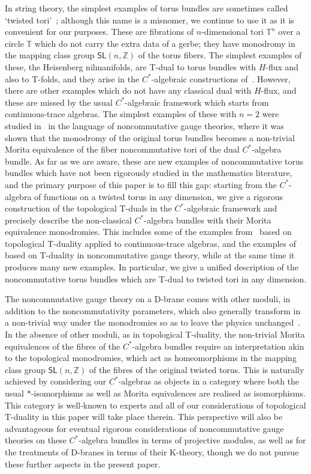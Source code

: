 \documentclass[pdftex]{sigma}
\numberwithin{equation}{section}
\newcommand{\Z}{\zed}
\newcommand{\sfSL}{\mathsf{SL}}
\newcommand{\zed}{{\mathbb Z}} %
\newcommand{\torus}{{\mathbb T}} %
\begin{document}
 In string theory, the simplest examples of torus bundles are sometimes
called `twisted to\-ri'~\cite{Dabholkar2002}; although this name is a
misnomer, we continue to use it as it is convenient for our
purposes. These are fibrations of $n$-dimensional tori $\torus^n$ over
a circle $\torus$ which do not carry the extra data of a gerbe; they have
monodromy in the mapping class group $\sfSL(n,\Z)$ of the torus
fibers. The simplest examples of these, the Heisenberg nilmanifolds,
are T-dual to torus bundles with $H$-flux and also to T-folds, and they
arise in the $C^*$-algebraic constructions
of~\cite{Mathai2004,Mathai2005}. However, there are other examples
which do not have any classical dual with $H$-flux, and these are
missed by the usual $C^*$-algebraic framework which starts from
continuous-trace algebras. The simplest examples of these with $n=2$ were studied
in~\cite{Hull2019} in the language of noncommutative gauge theories,
where it was shown that the monodromy of the original torus bundles
becomes a non-trivial Morita equivalence of the fiber noncommutative
tori of the dual $C^*$-algebra bundle. As far as we are aware, these
are new examples of noncommutative torus bundles which have not been
rigorously studied in the mathematics literature, and the primary
purpose of this paper is to fill this gap: starting from the
$C^*$-algebra of functions on a twisted torus in any dimension, we
give a rigorous construction of the topological T-duals in the
$C^*$-algebraic framework and precisely describe the non-classical
$C^*$-algebra bundles with their Morita equivalence monodromies. This
includes some of the examples from~\cite{Mathai2004,Mathai2005} based
on topological T-duality applied to continuous-trace algebras, and the
examples of~\cite{Hull2019} based on T-duality in noncommutative gauge
theory, while at the same time it produces many new examples. In
particular, we give a unified description of the noncommutative torus bundles
which are T-dual to twisted tori in any dimension.

The noncommutative gauge theory on a D-brane comes with other moduli,
in addition to the noncommutativity parameters, which also generally
transform in a non-trivial way under the monodromies so as to leave the physics
unchanged~\cite{Hull2019}. In the absence of other moduli, as in topological
T-duality, the non-trivial Morita equivalences of the fibres of the
$C^*$-algebra bundles require an interpretation akin to the
topological monodromies, which act as homeomorphisms in the mapping
class group $\sfSL(n,\Z)$ of the fibres of the original twisted
torus. This is naturally achieved by considering our $C^*$-algebras as objects in a
category where both the usual $*$-isomorphisms as well as Morita equivalences are
realised as isomorphisms. This category is well-known to experts and
all of our considerations of topological T-duality in this paper will
take place therein. This perspective will also be advantageous for
eventual rigorous considerations of noncommutative gauge theories on
these $C^*$-algebra bundles in terms of projective modules, as well as
for the treatments of D-branes in terms of their K-theory, though we
do not pursue these further aspects in the present paper.
\end{document}
